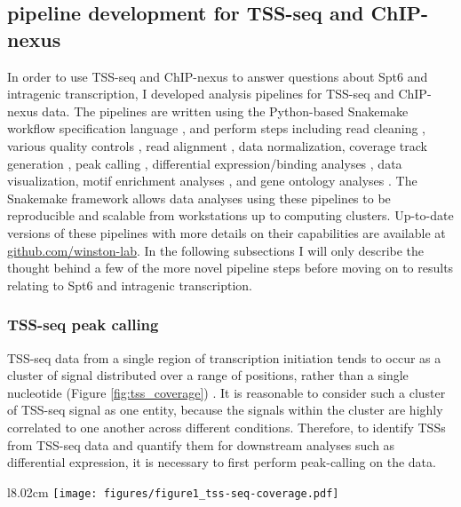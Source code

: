 \documentclass[9pt, letterpaper]{article}
\begin{document}
\subsection{pipeline development for TSS-seq and ChIP-nexus}

In order to use TSS-seq and ChIP-nexus to answer questions about Spt6 and intragenic transcription, I developed analysis pipelines for TSS-seq and ChIP-nexus data. The pipelines are written using the Python-based Snakemake workflow specification language \cite{koster2012}, and perform steps including read cleaning \cite{martin2011}, various quality controls \cite{andrews2012}, read alignment \cite{kim2013, langmead2012}, data normalization, coverage track generation \cite{quinlan2010}, peak calling \cite{zhang2008}, differential expression/binding analyses \cite{love2014}, data visualization, motif enrichment analyses \cite{bailey2015}, and gene ontology analyses \cite{young2010}. The Snakemake framework allows data analyses using these pipelines to be reproducible and scalable from workstations up to computing clusters. Up-to-date versions of these pipelines with more details on their capabilities are available at \href{https://github.com/winston-lab}{github.com/winston-lab}. In the following subsections I will only describe the thought behind a few of the more novel pipeline steps before moving on to results relating to Spt6 and intragenic transcription.

\subsubsection{TSS-seq peak calling}

TSS-seq data from a single region of transcription initiation tends to occur as a cluster of signal distributed over a range of positions, rather than a single nucleotide (Figure \ref{fig:tss_coverage}) \cite{arribere2013, malabat2015}. It is reasonable to consider such a cluster of TSS-seq signal as one entity, because the signals within the cluster are highly correlated to one another across different conditions. Therefore, to identify TSSs from TSS-seq data and quantify them for downstream analyses such as differential expression, it is necessary to first perform peak-calling on the data.

\begin{wrapfigure}[14]{l}{8.02cm}
\centering
\texttt{[image: figures/figure1\_tss-seq-coverage.pdf]}
\caption{Wild-type sense strand TSS-seq signal at the TEF1 genic TSS. Normalized counts are the mean of spike-in normalized coverage from two replicates.}
\label{fig:tss_coverage}
\end{wrapfigure}
\end{document}
